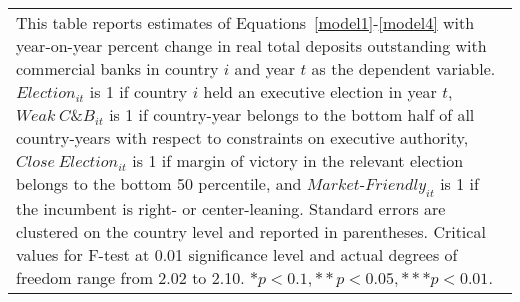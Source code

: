 \begin{longtable}{m{5cm}*{12}{c}}
\bottomrule                                          \multicolumn{13}{m{\linewidth}}{\footnotesize This table reports estimates of Equations~\eqref{model1}-\eqref{model4} with year-on-year percent change in real total deposits outstanding with commercial banks in country $ i $ and year $ t $ as the dependent variable. $ Election_{it} $ is 1 if country $ i $ held an executive election in year $ t $, $ Weak\ C\&B_{it} $ is 1 if country-year belongs to the bottom half of all country-years with respect to constraints on executive authority, $ Close\ Election_{it} $ is 1 if margin of victory in the relevant election belongs to the bottom 50 percentile, and $ Market\text{-}Friendly_{it} $ is 1 if the incumbent is right- or center-leaning. Standard errors are clustered on the country level and reported in parentheses. Critical values for F-test at 0.01 significance level and actual degrees of freedom range from 2.02 to 2.10. \( * p<0.1, ** p<0.05, *** p<0.01 \). }\\                                          \end{longtable}
